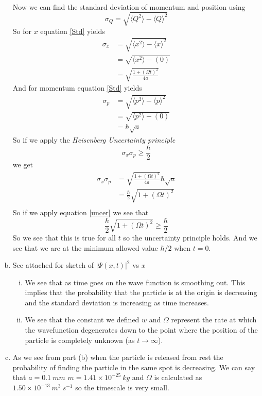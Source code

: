 \documentclass[11pt]{article}
\numberwithin{equation}{section}
\newcommand{\expt}[1]{\langle{#1}\rangle}
\begin{document}
\begin{enumerate}[(a)]
\begin{align*}
\end{align*}
Now we can find the standard deviation of momentum and position using
\begin{equation}
\sigma_Q = \sqrt{\expt{Q^2}-\expt{Q}^2}
\label{Std}
\end{equation}
So for $x$ equation \ref{Std} yields
\begin{align*}
\sigma_x &= \sqrt{\expt{x^2}-\expt{x}^2}\\
&= \sqrt{\expt{x^2}-(0)}\\
&= \sqrt{\frac{1+(\Omega t)^2}{4a}}
\end{align*}
And for momentum equation \ref{Std} yields
\begin{align*}
\sigma_p &= \sqrt{\expt{p^2}-\expt{p}^2}\\
&= \sqrt{\expt{p^2}-(0)}\\
&= \hbar\sqrt{a}
\end{align*}
So if we apply the \emph{Heisenberg Uncertainty principle}
\begin{equation}
\sigma_x\sigma_p\ge\frac{\hbar}{2}
\label{uncer}
\end{equation}
we get
\begin{align*}
\sigma_x\sigma_p &= \sqrt{\frac{1+(\Omega t)^2}{4a}}\hbar\sqrt{a}\\
&= \frac{\hbar}{2}\sqrt{1+(\Omega t)^2}\\
\end{align*}
So if we apply equation \ref{uncer} we see that
$$\frac{\hbar}{2}\sqrt{1+(\Omega t)^2}\ge\frac{\hbar}{2}$$
So we see that this is true for all $t$ so the uncertainty principle holds. And we see that we are at the minimum allowed value $\hbar/2$ when $t=0$.

\item
See attached for sketch of $|\Psi(x,t)|^2$ vs $x$
\begin{enumerate}[(i)]
\item We see that as time goes on the wave function is smoothing out. This implies that the probability that the particle is at the origin is decreasing and the standard deviation is increasing as time increases. 

\item We see that the constant we defined $w$ and $\Omega$ represent the rate at which the wavefunction degenerates down to the point where the position of the particle is completely unknown (as $t\rightarrow\infty$).
\end{enumerate}


\item
As we see from part (b) when the particle is released from rest the probability of finding the particle in the same spot is decreasing. We can say that $a=0.1\ mm$ $m = 1.41\times10^{-25}\ kg$ and $\Omega$ is calculated as $1.50\times10^{-13}\ m^3\ s^{-1}$ so the timescale is very small. 

\end{enumerate}
\end{document}
